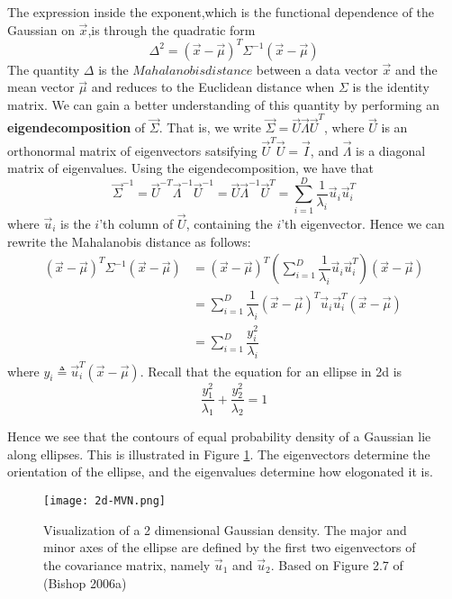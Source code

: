 The expression inside the exponent,which is the functional dependence of the Gaussian on $\vec{x}$,is through the quadratic form
\begin{equation}\label{eqn:Gaussian quadratic form}
	\Delta^2 = (\vec{x}-\vec{\mu})^T\Sigma^{-1}(\vec{x}-\vec{\mu})
\end{equation}
 The quantity $\Delta$ is the $Mahalanobis distance$ between a data vector $\vec{x}$ and the mean vector $\vec{\mu}$ and reduces to the Euclidean distance when $\Sigma$ is the identity matrix. We can gain a better understanding of this quantity by performing an \textbf{eigendecomposition} of $\vec{\Sigma}$. That is, we write $\vec{\Sigma}=\vec{U}\vec{\Lambda}\vec{U}^T$, where $\vec{U}$ is an orthonormal matrix of eigenvectors satsifying $\vec{U}^T\vec{U}=\vec{I}$, and $\vec{\Lambda}$ is a diagonal matrix of eigenvalues. Using the eigendecomposition, we have that
\begin{equation}
\vec{\Sigma}^{-1}=\vec{U}^{-T}\vec{\Lambda}^{-1}\vec{U}^{-1}=\vec{U}\vec{\Lambda}^{-1}\vec{U}^T=\sum\limits_{i=1}^D \dfrac{1}{\lambda_i}\vec{u}_i\vec{u}_i^T
\end{equation}
where $\vec{u}_i$ is the $i$'th column of $\vec{U}$, containing the $i$'th eigenvector. Hence we can rewrite the Mahalanobis distance as follows:
\begin{align}
(\vec{x}-\vec{\mu})^T\Sigma^{-1}(\vec{x}-\vec{\mu}) & =(\vec{x}-\vec{\mu})^T\left(\sum\limits_{i=1}^D \dfrac{1}{\lambda_i}\vec{u}_i\vec{u}_i^T\right)(\vec{x}-\vec{\mu}) \\
    & =\sum\limits_{i=1}^D \dfrac{1}{\lambda_i}(\vec{x}-\vec{\mu})^T\vec{u}_i\vec{u}_i^T(\vec{x}-\vec{\mu}) \\
	& =\sum\limits_{i=1}^D \dfrac{y_i^2}{\lambda_i}
\end{align}
where $y_i \triangleq \vec{u}_i^T(\vec{x}-\vec{\mu})$. Recall that the equation for an ellipse in 2d is
\begin{equation}
\dfrac{y_1^2}{\lambda_1}+\dfrac{y_2^2}{\lambda_2}=1
\end{equation}

Hence we see that the contours of equal probability density of a Gaussian lie along ellipses. This is illustrated in Figure \ref{fig:2d-MVN}. The eigenvectors determine the orientation of the ellipse, and the eigenvalues determine how elogonated it is.

\begin{figure}[hbtp]
\centering
    \texttt{[image: 2d-MVN.png]}
\caption{Visualization of a 2 dimensional Gaussian density. The major and minor axes of the ellipse are defined by the first two eigenvectors of the covariance matrix, namely $\vec{u}_1$ and $\vec{u}_2$. Based on Figure 2.7 of (Bishop 2006a)}
\label{fig:2d-MVN} 
\end{figure}

